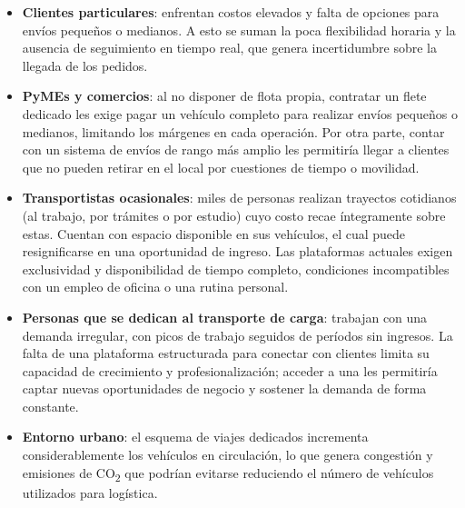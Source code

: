 \begin{itemize}[leftmargin=2em]
	\item \textbf{Clientes particulares}: enfrentan costos elevados y falta de opciones para envíos pequeños o medianos. A esto se suman la poca flexibilidad horaria y la ausencia de seguimiento en tiempo real, que genera incertidumbre sobre la llegada de los pedidos.
    \item \textbf{PyMEs y comercios}: al no disponer de flota propia, contratar un flete dedicado les exige pagar un vehículo completo para realizar envíos pequeños o medianos, limitando los márgenes en cada operación.  Por otra parte, contar con un sistema de envíos de rango más amplio les permitiría llegar a clientes que no pueden retirar en el local por cuestiones de tiempo o movilidad.
    \item \textbf{Transportistas ocasionales}: miles de personas realizan trayectos cotidianos (al trabajo, por trámites o por estudio) cuyo costo recae íntegramente sobre estas. Cuentan con espacio disponible en sus vehículos, el cual puede resignificarse en una oportunidad de ingreso. Las plataformas actuales exigen exclusividad y disponibilidad de tiempo completo, condiciones incompatibles con un empleo de oficina o una rutina personal.
    \item \textbf{Personas que se dedican al transporte de carga}: trabajan con una demanda irregular, con picos de trabajo seguidos de períodos sin ingresos. La falta de una plataforma estructurada para conectar con clientes limita su capacidad de crecimiento y profesionalización; acceder a una les permitiría captar nuevas oportunidades de negocio y sostener la demanda de forma constante.
	\item \textbf{Entorno urbano}: el esquema de viajes dedicados incrementa considerablemente los vehículos en circulación, lo que genera congestión y emisiones de CO\textsubscript{2} que podrían evitarse reduciendo el número de vehículos utilizados para logística.
\end{itemize}

